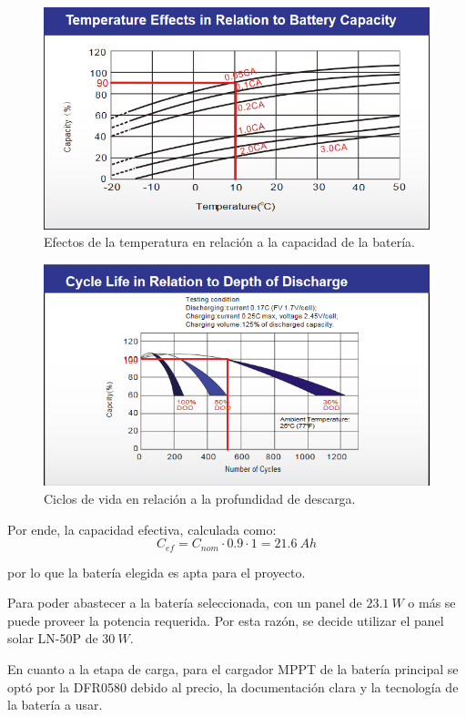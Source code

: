 \begin{figure}[H]
	\centering
	\includegraphics[width=0.9\linewidth]{ImagenesFactibilidad/UL24-12_Ctemp}	
	\caption{Efectos de la temperatura en relación a la capacidad de la batería.}
	\label{fig:ctemp}
\end{figure}

\begin{figure}[H]
	\centering
	\includegraphics[width=0.9\linewidth]{ImagenesFactibilidad/UL24-12_Cdod}	
	\caption{Ciclos de vida en relación a la profundidad de descarga.}
	\label{fig:cdod}
\end{figure}

Por ende, la capacidad efectiva, calculada como:
\begin{equation}
C_{ef} = C_{nom} \cdot 0.9 \cdot 1 = 21.6 \ Ah
\end{equation}

por lo que la batería elegida es apta para el proyecto.


Para poder abastecer a la batería seleccionada, con un panel de $23.1 \ W$ o más se puede proveer la potencia requerida. Por esta razón, se decide utilizar el panel solar LN-50P de $30 \ W$.

En cuanto a la etapa de carga, para el cargador MPPT de la batería principal se optó por la DFR0580 debido al precio, la documentación clara y la tecnología de la batería a usar.

